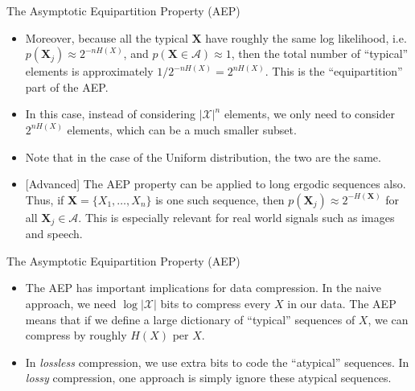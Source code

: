 \documentclass{beamer}
\begin{document}
\begin{frame}{The Asymptotic Equipartition Property (AEP)}
	\begin{itemize}
		\item Moreover, because all the typical $\boldsymbol{X}$ have roughly the same log likelihood, i.e. $p(\boldsymbol{X}_j) \approx 2^{-nH(X)}$, and $p(\boldsymbol{X} \in \mathcal{A}) \approx 1$, then the total number of ``typical'' elements is approximately $1/2^{-nH(X)} = 2^{nH(X)}$. This is the ``equipartition'' part of the AEP. 
		\item In this case, instead of considering $|\mathcal{X}|^n$ elements, we only need to consider $2^{nH(X)}$ elements, which can be a much smaller subset. 
		\item Note that in the case of the Uniform distribution, the two are the same.
		\item{} [Advanced] The AEP property can be applied to long ergodic sequences also. Thus, if $\boldsymbol{X}=\{X_1, \ldots, X_n \}$ is one such sequence, then $p(\boldsymbol{X}_j) \approx 2^{-H(\boldsymbol{X})}$ for all $\boldsymbol{X}_j \in \mathcal{A}$. This is especially relevant for real world signals such as images and speech. 
	\end{itemize}
\end{frame}

\begin{frame}{The Asymptotic Equipartition Property (AEP)}
\begin{itemize}
	\item The AEP has important implications for data compression. In the naive approach, we need $\log |\mathcal{X}|$ bits to compress every $X$ in our data. The AEP means that if we define a large dictionary of ``typical'' sequences of $X$, we can compress by roughly $H(X)$ per $X$. 
	\item In \emph{lossless} compression, we use extra bits to code the ``atypical'' sequences. In \emph{lossy} compression, one approach is simply ignore these atypical sequences. 
\end{itemize}
\end{frame}
\end{document}
